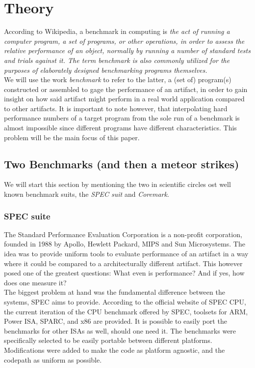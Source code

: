 \documentclass[../bachelor_paper.tex]{subfiles}
\begin{document}
\chapter{Theory}
    \label{ch:theory}

According to Wikipedia, a benchmark in computing is \emph{the act of running a computer program, a set of programs, or other operations, in order to assess the relative performance of an object, normally by running a number of standard tests and trials against it. The term benchmark is also commonly utilized for the purposes of elaborately designed benchmarking programs themselves.} \cite{BenchmarkComputing2021} \\
We will use the work \emph{benchmark} to refer to the latter, a (set of) program(s) constructed or assembled to gage the performance of an artifact, in order to gain insight on how said artifact might perform in a real world application compared to other artifacts. It is important to note however, that interpolating hard performance numbers of a target program from the sole run of a benchmark is almost impossible since different programs have different characteristics. This problem will be the main focus of this paper.\\

\section*{Two Benchmarks (and then a meteor strikes)}
We will start this section by mentioning the two in scientific circles ost well known benchmark suits, the \emph{SPEC suit} and \emph{Coremark}.

\subsection*{SPEC suite}
The Standard Performance Evaluation Corporation is a non-profit corporation, founded in 1988 by Apollo, Hewlett Packard, MIPS and Sun Microsystems. \cite{dixitSPECBenchmarks1991} The idea was to provide uniform tools to evaluate performance of an artifact in a way where it could be compared to a architecturally different artifact. This however posed one of the greatest questions: What even is performance? And  if yes, how does one measure it?\\
The biggest problem at hand was the fundamental difference between the systems, \acs{SPEC} aims to provide. According to the official website of \acs{SPEC} CPU, the current iteration of the CPU benchmark offered by \acs{SPEC}, toolsets for ARM, Power ISA, SPARC, and x86 are provided. It is possible to easily port the benchmarks for other \acs{ISA}s as well, should one need it. The benchmarks were specifically selected to be easily portable between different platforms. Modifications were added to make the code as platform agnostic, and the codepath as uniform as possible.
\end{document}

